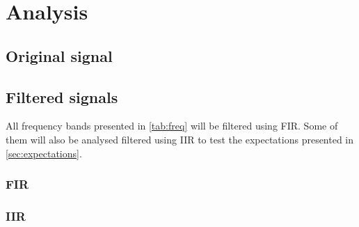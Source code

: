 
\section{Analysis}


\subsection{Original signal}

\subsection{Filtered signals}
All frequency bands presented in \cref{tab:freq} will be filtered using FIR. Some of them will also be analysed filtered using IIR to test the expectations presented in \cref{sec:expectations}.

\subsubsection{FIR}

\subsubsection{IIR}